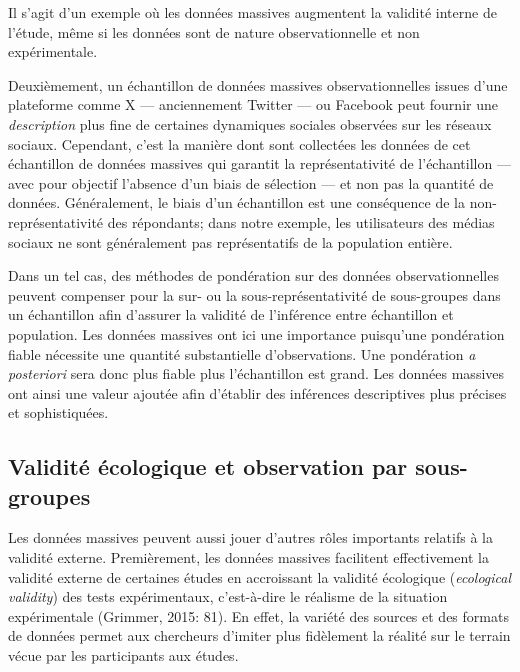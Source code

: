 \documentclass[
  letterpaper,
  DIV=11,
  numbers=noendperiod]{scrreprt}
\begin{document}
Il s'agit d'un exemple où les données massives augmentent la validité
interne de l'étude, même si les données sont de nature observationnelle
et non expérimentale.

Deuxièmement, un échantillon de données massives observationnelles
issues d'une plateforme comme X --- anciennement Twitter --- ou Facebook
peut fournir une \emph{description} plus fine de certaines dynamiques
sociales observées sur les réseaux sociaux. Cependant, c'est la manière
dont sont collectées les données de cet échantillon de données massives
qui garantit la représentativité de l'échantillon --- avec pour objectif
l'absence d'un biais de sélection --- et non pas la quantité de données.
Généralement, le biais d'un échantillon est une conséquence de la
non-représentativité des répondants; dans notre exemple, les
utilisateurs des médias sociaux ne sont généralement pas représentatifs
de la population entière.

Dans un tel cas, des méthodes de pondération sur des données
observationnelles peuvent compenser pour la sur- ou la
sous-représentativité de sous-groupes dans un échantillon afin d'assurer
la validité de l'inférence entre échantillon et population. Les données
massives ont ici une importance puisqu'une pondération fiable nécessite
une quantité substantielle d'observations. Une pondération \emph{a
posteriori} sera donc plus fiable plus l'échantillon est grand. Les
données massives ont ainsi une valeur ajoutée afin d'établir des
inférences descriptives plus précises et sophistiquées.

\hypertarget{validituxe9-uxe9cologique-et-observation-par-sous-groupes}{%
\subsection*{Validité écologique et observation par
sous-groupes}\label{validituxe9-uxe9cologique-et-observation-par-sous-groupes}}

Les données massives peuvent aussi jouer d'autres rôles importants
relatifs à la validité externe. Premièrement, les données massives
facilitent effectivement la validité externe de certaines études en
accroissant la validité écologique (\emph{ecological validity}) des
tests expérimentaux, c'est-à-dire le réalisme de la situation
expérimentale (Grimmer, 2015: 81). En effet, la variété des sources et
des formats de données permet aux chercheurs d'imiter plus fidèlement la
réalité sur le terrain vécue par les participants aux études.
\end{document}
